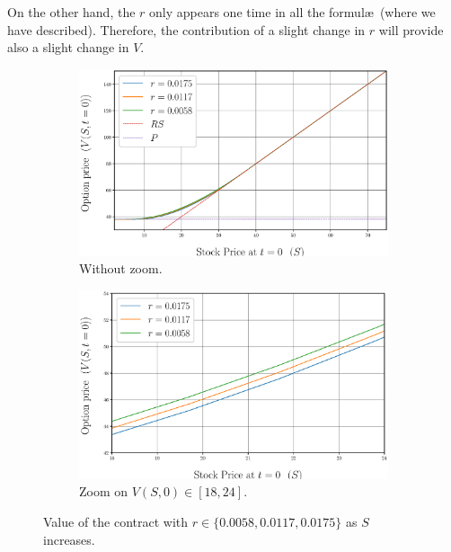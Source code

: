 On the other hand, the $r$ only appears one time in all the formul\ae \ (where we have described). Therefore, the contribution of a slight change in $r$ will provide also a slight change in $V$.
\begin{figure}[h]
	\centering
	\begin{subfigure}[t]{0.5\textwidth}
		\centering
		\includegraphics[scale=0.36]{img/Q2/amConvBondValues_incrS_DifferentInterestRates}
		\captionsetup{width=0.65\linewidth, font=footnotesize}
		\caption{Without zoom.}\label{analysisDifferent_r_withoutZoom}
	\end{subfigure}%
	\begin{subfigure}[t]{0.5\textwidth}
		\centering
		\includegraphics[scale=0.36]{img/Q2/amConvBondValues_incrS_DifferentInterestRatesZoom}
		\captionsetup{width=0.65\linewidth,font=footnotesize}
		\caption{Zoom on $V(S,0)\in [18,24]$.}\label{analysis_different_r_Zoom}
	\end{subfigure}
	\caption{Value of the contract with $r\in\{0.0058,0.0117,0.0175\}$ as $S$ increases.}\label{analysisDifferent_r}
\end{figure}

